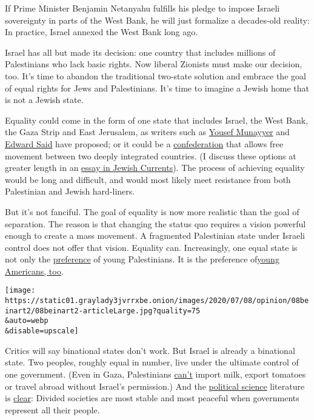If Prime Minister Benjamin Netanyahu fulfills his pledge to impose
Israeli sovereignty in parts of the West Bank, he will just formalize a
decades-old reality: In practice, Israel annexed the West Bank long ago.

Israel has all but made its decision: one country that includes millions
of Palestinians who lack basic rights. Now liberal Zionists must make
our decision, too. It's time to abandon the traditional two-state
solution and embrace the goal of equal rights for Jews and Palestinians.
It's time to imagine a Jewish home that is not a Jewish state.

Equality could come in the form of one state that includes Israel, the
West Bank, the Gaza Strip and East Jerusalem, as writers such as
\href{https://www.foreignaffairs.com/articles/israel/2019-10-15/there-will-be-one-state-solution}{Yousef
Munayyer} and
\href{https://www.nytimes3xbfgragh.onion/1999/01/10/magazine/the-one-state-solution.html}{Edward
Said} have proposed; or it could be a
\href{https://www.alandforall.org/english/?d=ltr}{confederation} that
allows free movement between two deeply integrated countries. (I discuss
these options at greater length in an
\href{https://jewishcurrents.org/yavne-a-jewish-case-for-equality-in-israel-palestine/}{essay
in Jewish Currents}). The process of achieving equality would be long
and difficult, and would most likely meet resistance from both
Palestinian and Jewish hard-liners.

But it's not fanciful. The goal of equality is now more realistic than
the goal of separation. The reason is that changing the status quo
requires a vision powerful enough to create a mass movement. A
fragmented Palestinian state under Israeli control does not offer that
vision. Equality can. Increasingly, one equal state is not only the
\href{https://www.ft.com/content/5c7ed0b2-fe74-11e6-96f8-3700c5664d30}{preference}
of young Palestinians. It is the preference
of\href{https://sadat.umd.edu/sites/sadat.umd.edu/files/UMCIP\%20Questionnaire\%20Sep\%20to\%20Oct\%202018.pdf}{young
Americans, too}.

\texttt{[image: https://static01.graylady3jvrrxbe.onion/images/2020/07/08/opinion/08beinart2/08beinart2-articleLarge.jpg?quality=75\\\&auto=webp\\\&disable=upscale]}

Critics will say binational states don't work. But Israel is already a
binational state. Two peoples, roughly equal in number, live under the
ultimate control of one government. (Even in Gaza, Palestinians
\href{https://gisha.org/publication/1649}{can't} import milk, export
tomatoes or travel abroad without Israel's permission.) And the
\href{https://journals.sagepub.com/doi/10.1177/019251219301400203}{political
science} literature is
\href{https://www.jstor.org/stable/40646192?seq=1}{clear}: Divided
societies are most stable and most peaceful when governments represent
all their people.

